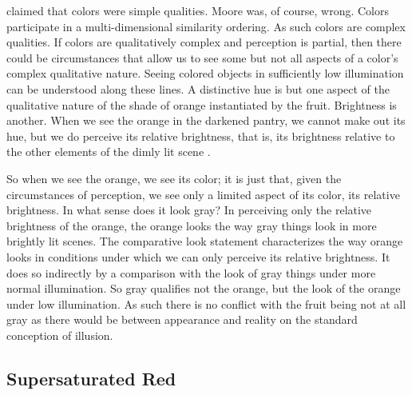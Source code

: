 \documentclass[12pt]{article}
\begin{document}
\citet{Moore:1903lr} claimed that colors were simple qualities. Moore was, of course, wrong. Colors participate in a multi-dimensional similarity ordering. As such colors are complex qualities. If colors are qualitatively complex and perception is partial, then there could be circumstances that allow us to see some but not all aspects of a color's complex qualitative nature. Seeing colored objects in sufficiently low illumination can be understood along these lines. A distinctive hue is but one aspect of the qualitative nature of the shade of orange instantiated by the fruit. Brightness is another. When we see the orange in the darkened pantry, we cannot make out its hue, but we do perceive its relative brightness, that is, its brightness relative to the other elements of the dimly lit scene \citep[see][]{Arthadeva:1961vn}.

So when we see the orange, we see its color; it is just that, given the circumstances of perception, we see only a limited aspect of its color, its relative brightness. In what sense does it look gray? In perceiving only the relative brightness of the orange, the orange looks the way gray things look in more brightly lit scenes. The comparative look statement characterizes the way orange looks in conditions under which we can only perceive its relative brightness. It does so indirectly by a comparison with the look of gray things under more normal illumination. So gray qualifies not the orange, but the look of the orange under low illumination. As such there is no conflict with the fruit being not at all gray as there would be between appearance and reality on the standard conception of illusion. 



\subsection{Supersaturated Red}\label{sub:supersaturated_red} %
\end{document}
